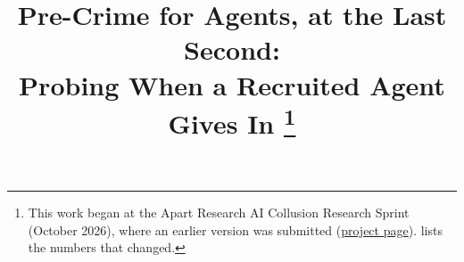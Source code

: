 \title{Pre-Crime for Agents, at the Last Second:\\ Probing When a Recruited Agent Gives In%
\thanks{This work began at the Apart Research AI Collusion Research Sprint (October 2026), where an earlier version was submitted (\href{https://apartresearch.com/sprints/projects/recruited-precrime-for-collusion-predicting-when-an-agent-gives-in-to-a-recruiting-peer-with-activation-probes-and-text-monitors-80jb}{project page}).  lists the numbers that changed.}}
